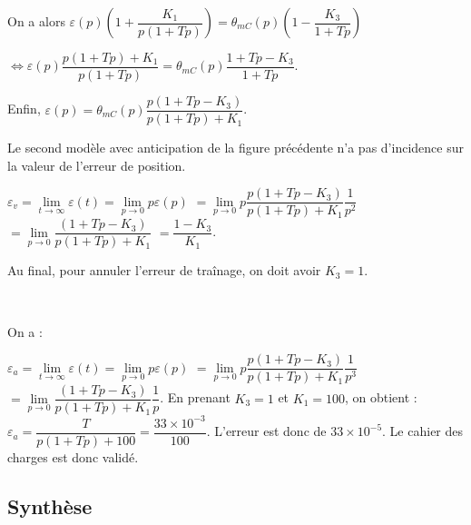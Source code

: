 \begin{multicols}{2}
\begin{corrige}
On a alors 
$
\varepsilon(p)  \left(1+ \dfrac{K_1 }{p \left( 1+Tp\right)} \right)
=  \theta_{mC}(p)\left(1-  \dfrac{K_3}{ 1+Tp}\right)$

$\Leftrightarrow
\varepsilon(p)  \dfrac{p \left( 1+Tp\right)+K_1 }{p \left( 1+Tp\right)} 
=  \theta_{mC}(p)  \dfrac{ 1+Tp-K_3  }{ 1+Tp}
$.

Enfin,  
$\varepsilon(p) = \theta_{mC}(p)\dfrac{p\left( 1+Tp-K_3\right) }{p \left( 1+Tp\right)+K_1}
$.
\end{corrige}

\else
\fi

Le second modèle avec anticipation de la figure précédente n’a pas d’incidence sur la valeur de l’erreur de position.


\ifprof

\begin{corrige}
$\varepsilon_v = \lim\limits_{t\to \infty} \varepsilon(t)= \lim\limits_{p\to 0} p\varepsilon(p) $ 
$= \lim\limits_{p\to 0} p \dfrac{p\left( 1+Tp-K_3\right) }{p \left( 1+Tp\right)+K_1} \dfrac {1}{p^2}$
$= \lim\limits_{p\to 0}  \dfrac{\left( 1+Tp-K_3\right) }{p \left( 1+Tp\right)+K_1}$
$=\dfrac{1-K_3}{K_1}$.


Au final, pour annuler l'erreur de traînage, on doit avoir $K_3=1$.
\end{corrige}
\else
\fi
{}\\

\ifprof

On a : 

\begin{corrige}
$\varepsilon_a = \lim\limits_{t\to \infty} \varepsilon(t)= \lim\limits_{p\to 0} p\varepsilon(p) $ 
$= \lim\limits_{p\to 0} p \dfrac{p\left( 1+Tp-K_3\right) }{p \left( 1+Tp\right)+K_1} \dfrac {1}{p^3}$
$= \lim\limits_{p\to 0} \dfrac{\left( 1+Tp-K_3\right) }{p \left( 1+Tp\right)+K_1} \dfrac {1}{p}$. En prenant $K_3=1$ et $K_1=100$, on obtient :
$\varepsilon_a = \dfrac{ T}{p \left( 1+Tp\right)+100}=\dfrac{33\times 10^{-3}}{100} $.
L'erreur est donc de $33\times 10^{-5}$. Le cahier des charges est donc validé. 

\end{corrige}
\else
\fi

\subsection*{Synthèse}
\\


\end{multicols}
